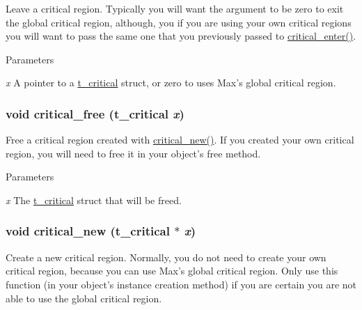 Leave a critical region. Typically you will want the argument to be zero to exit the global critical region, although, you if you are using your own critical regions you will want to pass the same one that you previously passed to \hyperlink{group__critical_ga246445cffc822f756ac6fb34a055022d}{critical\_\-enter()}.


\begin{DoxyParams}{Parameters}
\item[{\em x}]A pointer to a \hyperlink{group__critical_gaa00494020fc3fa3005b63a294cab3886}{t\_\-critical} struct, or zero to uses Max’s global critical region. \end{DoxyParams}
\hypertarget{group__critical_gaedbe0cba11940710c789ac01194e3712}{
\subsubsection[{critical\_\-free}]{\setlength{\rightskip}{0pt plus 5cm}void critical\_\-free ({\bf t\_\-critical} {\em x})}}
\label{group__critical_gaedbe0cba11940710c789ac01194e3712}


Free a critical region created with \hyperlink{group__critical_gaaa373bcd9c8059e4887225aaf32a76d2}{critical\_\-new()}. If you created your own critical region, you will need to free it in your object’s free method.


\begin{DoxyParams}{Parameters}
\item[{\em x}]The \hyperlink{group__critical_gaa00494020fc3fa3005b63a294cab3886}{t\_\-critical} struct that will be freed. \end{DoxyParams}
\hypertarget{group__critical_gaaa373bcd9c8059e4887225aaf32a76d2}{
\subsubsection[{critical\_\-new}]{\setlength{\rightskip}{0pt plus 5cm}void critical\_\-new ({\bf t\_\-critical} $\ast$ {\em x})}}
\label{group__critical_gaaa373bcd9c8059e4887225aaf32a76d2}


Create a new critical region. Normally, you do not need to create your own critical region, because you can use Max’s global critical region. Only use this function (in your object’s instance creation method) if you are certain you are not able to use the global critical region.


